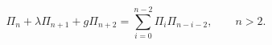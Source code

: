 \begin{equation}
    \Pi_n+\lambda \Pi_{n+1}+g\Pi_{n+2}=\sum_{i=0}^{n-2}\Pi_i\Pi_{n-i-2}, \qquad n>2.
\end{equation}

